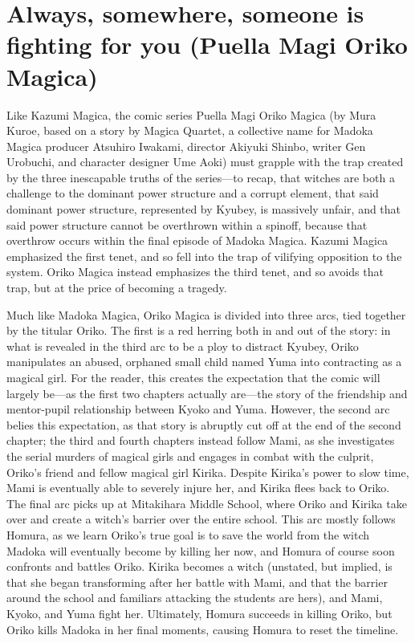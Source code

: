 \chapter{Always, somewhere, someone is fighting for you (Puella Magi Oriko Magica)}
Like Kazumi Magica, the comic series Puella Magi Oriko Magica (by Mura Kuroe, based on a story by Magica Quartet, a collective name for Madoka Magica producer Atsuhiro Iwakami, director Akiyuki Shinbo, writer Gen Urobuchi, and character designer Ume Aoki) must grapple with the trap created by the three inescapable truths of the series—to recap, that witches are both a challenge to the dominant power structure and a corrupt element, that said dominant power structure, represented by Kyubey, is massively unfair, and that said power structure cannot be overthrown within a spinoff, because that overthrow occurs within the final episode of Madoka Magica. Kazumi Magica emphasized the first tenet, and so fell into the trap of vilifying opposition to the system. Oriko Magica instead emphasizes the third tenet, and so avoids that trap, but at the price of becoming a tragedy.

Much like Madoka Magica, Oriko Magica is divided into three arcs, tied together by the titular Oriko. The first is a red herring both in and out of the story: in what is revealed in the third arc to be a ploy to distract Kyubey, Oriko manipulates an abused, orphaned small child named Yuma into contracting as a magical girl. For the reader, this creates the expectation that the comic will largely be—as the first two chapters actually are—the story of the friendship and mentor-pupil relationship between Kyoko and Yuma. However, the second arc belies this expectation, as that story is abruptly cut off at the end of the second chapter; the third and fourth chapters instead follow Mami, as she investigates the serial murders of magical girls and engages in combat with the culprit, Oriko's friend and fellow magical girl Kirika. Despite Kirika's power to slow time, Mami is eventually able to severely injure her, and Kirika flees back to Oriko. The final arc picks up at Mitakihara Middle School, where Oriko and Kirika take over and create a witch's barrier over the entire school. This arc mostly follows Homura, as we learn Oriko's true goal is to save the world from the witch Madoka will eventually become by killing her now, and Homura of course soon confronts and battles Oriko. Kirika becomes a witch (unstated, but implied, is that she began transforming after her battle with Mami, and that the barrier around the school and familiars attacking the students are hers), and Mami, Kyoko, and Yuma fight her. Ultimately, Homura succeeds in killing Oriko, but Oriko kills Madoka in her final moments, causing Homura to reset the timeline.

